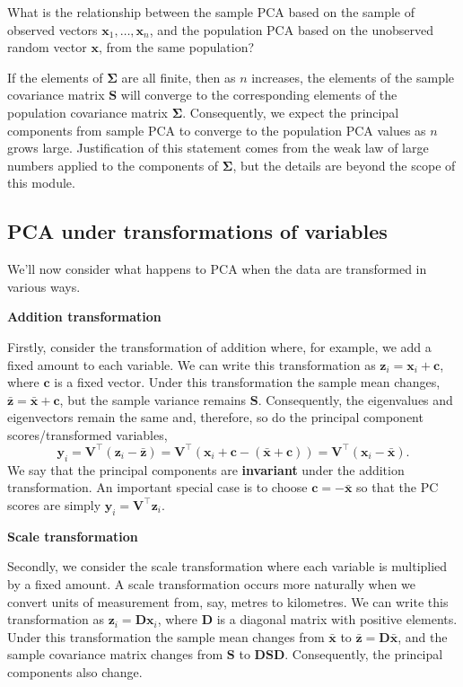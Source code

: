 \documentclass[
]{book}
\theoremstyle{definition}
\theoremstyle{definition}
\theoremstyle{definition}
\theoremstyle{definition}
\theoremstyle{remark}
\begin{document}
What is the relationship between the sample PCA based on the sample of observed vectors \(\mathbf x_1, \ldots , \mathbf x_n\), and the population PCA based on the unobserved random vector \(\mathbf x\),
from the same population?

If the elements of \(\boldsymbol{\Sigma}\) are all finite, then as \(n\) increases, the elements of the sample covariance matrix \(\mathbf S\) will converge to the corresponding elements
of the population covariance matrix \(\boldsymbol{\Sigma}\). Consequently, we expect the principal components from sample PCA to converge to the population PCA values as \(n\) grows large. Justification of this statement comes from the weak law of large numbers applied to the components of \(\boldsymbol{\Sigma}\), but the details are beyond the scope of this module.

\subsection{PCA under transformations of variables}\label{pca-under-transformations-of-variables}

We'll now consider what happens to PCA when the data are transformed in various ways.

\textbf{Addition transformation}

Firstly, consider the transformation of addition where, for example, we add a fixed amount to each variable.
We can write this transformation as \(\mathbf z_i = \mathbf x_i + \mathbf c\), where \(\mathbf c\) is a fixed vector. Under this transformation the sample mean changes, \(\bar{\mathbf z} = \bar{\mathbf x} + \mathbf c\), but the sample variance remains \(\mathbf S\). Consequently, the eigenvalues and eigenvectors remain the same and, therefore, so do the principal component scores/transformed variables,
\[\mathbf y_i = \mathbf V^\top (\mathbf z_i - \bar{\mathbf z}) = \mathbf V^\top(\mathbf x_i + \mathbf c- (\bar{\mathbf x} + \mathbf c)) = \mathbf V^\top (\mathbf x_i - \bar{\mathbf x}).\]
We say that the principal components are \textbf{invariant} under the addition transformation. An important special case is to choose \(\mathbf c= -\bar{\mathbf x}\) so that the PC scores are simply \(\mathbf y_i = \mathbf V^\top \mathbf z_i\).

\textbf{Scale transformation}

Secondly, we consider the scale transformation where each variable is multiplied by a fixed amount.
A scale transformation occurs more naturally when we convert units of measurement from, say, metres to kilometres. We can write this transformation as \(\mathbf z_i = \mathbf D\mathbf x_i\), where \(\mathbf D\) is a diagonal matrix with positive elements. Under this transformation the sample mean changes from \(\bar{\mathbf x}\) to \(\bar{\mathbf z} = \mathbf D\bar{\mathbf x}\), and the sample covariance matrix changes from \(\mathbf S\) to \(\mathbf D\mathbf S\mathbf D\). Consequently, the principal components also change.
\end{document}

